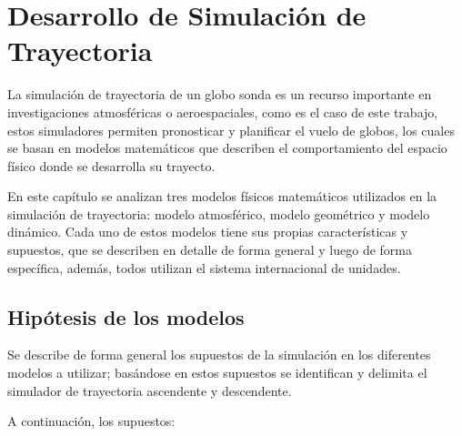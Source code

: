 \chapter{Desarrollo de Simulación de Trayectoria} \label{chp:02_simulacion}

\vspace{0.2cm}

La simulación de trayectoria de un globo sonda es un recurso importante en investigaciones atmosféricas o aeroespaciales, como es el caso de este trabajo, estos simuladores permiten pronosticar y planificar el vuelo de globos, los cuales se basan en modelos matemáticos que describen el comportamiento del  espacio físico donde se desarrolla su trayecto.

\vspace{0.5cm}

En este capítulo se analizan tres modelos físicos matemáticos utilizados en la simulación de trayectoria: modelo atmosférico, modelo geométrico y  modelo dinámico. Cada uno de estos modelos tiene sus propias características y supuestos, que se describen en detalle de forma general y luego de forma específica, además, todos utilizan  el sistema internacional  de unidades.

\newpage

\section{Hipótesis de los modelos} \label{sct:simulacion:hipotesis}

Se describe de forma general los supuestos de la simulación en los diferentes modelos a utilizar; basándose en estos supuestos se identifican y delimita el simulador de trayectoria ascendente y descendente. 

\vspace{0.7cm}

A continuación, los supuestos:

